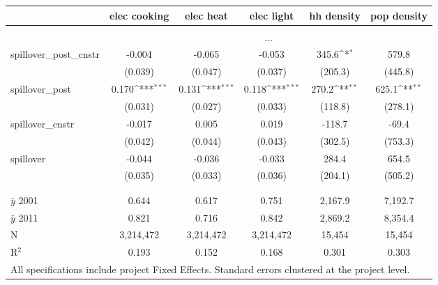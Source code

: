 {\footnotesize
{}  
\def\sym#1{\ifmmode^{#1}\else\(^{#1}\)\fi}
\begin{tabular}{l*{5}{c}}
          &\multicolumn{1}{c}{elec cooking} &\multicolumn{1}{c}{elec heat}  &\multicolumn{1}{c}{elec light}         &\multicolumn{1}{c}{hh density}         &\multicolumn{1}{c}{pop density}      \\[0.2em]
\hline\\[-0.9em]
& \multicolumn{5}{c}{...}\\
[.5em]
\rowcolor{o} {\scriptsize spillover\_post\_cnstr}  & -0.004   &   -0.065  &   -0.053   &  345.6\sym{*}  &  579.8     \\
\rowcolor{o}                &  (0.039) &  (0.047)  &  (0.037)   &(205.3)         &(445.8)     \\ 
[.5em]
{\scriptsize spillover\_post} & 0.170\sym{***}&0.131\sym{***} &0.118\sym{***} & 270.2\sym{**} &  625.1\sym{**} \\
                & (0.031)       &  (0.027)      &  (0.033)      &(118.8)        &(278.1)       \\       
[.5em]
{\scriptsize spillover\_cnstr} &  -0.017    &    0.005    &    0.019     & -118.7      &  -69.4        \\
                    &  (0.042)   &  (0.044)    &  (0.043)     &(302.5)      &(753.3)        \\
[.5em]
{\scriptsize spillover} &   -0.044    &   -0.036   &   -0.033    &  284.4   &  654.5         \\
          &  (0.035)    &  (0.033)   &  (0.036)    &(204.1)   &(505.2)         \\
		\\[-0.9em]
\hline \\[-0.9em]
$\bar{y}$ 2001& 0.644      &    0.617       &    0.751       &2,167.9      &7,192.7         \\
$\bar{y}$ 2011& 0.821      &    0.716       &    0.842       &2,869.2      &8,354.4         \\
N          &  3,214,472    &  3,214,472     &  3,214,472     & 15,454        &    15,454         \\
R$^{2}$    & 0.193         &    0.152       &    0.168       &    0.301      &    0.303         \\
\hline
\multicolumn{6}{l}{\tiny All specifications include project Fixed Effects. Standard errors clustered at the project level.}
\end{tabular}
}
